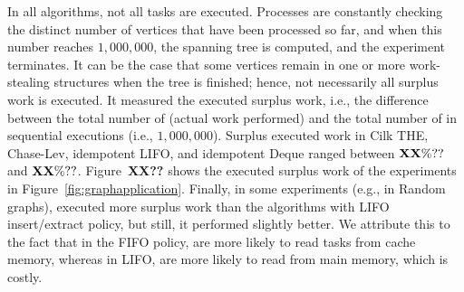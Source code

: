 In all algorithms, not all tasks are executed. Processes are constantly checking the distinct number of vertices that have been processed so far, and when this number reaches $1,000,000$, the spanning tree is computed, and the experiment terminates. It can be the case that some vertices remain in one or more work-stealing structures when the tree is finished; hence, not necessarily all surplus work is executed. It measured the executed surplus work, i.e., the difference between the total number of \Takes (actual work performed) and the total number of \Takes in sequential executions (i.e., $1,000,000$). Surplus executed work in Cilk THE, Chase-Lev, idempotent LIFO, and idempotent Deque ranged between $\bf XX\%??$ and $\bf XX\%??$. Figure~{\bf XX??} shows the executed surplus work of the experiments in Figure~\ref{fig:graphapplication}. Finally, in some experiments (e.g., in Random graphs), \NCWSM executed more surplus work than the algorithms with LIFO insert/extract policy, but still, it performed slightly better. We attribute this to the fact that in the FIFO policy, \Takes are more likely to read tasks from cache memory, whereas in LIFO, \Takes are more likely to read from main memory, which is costly.



